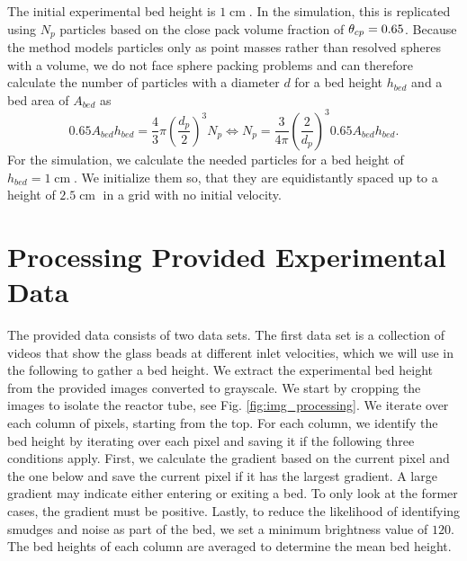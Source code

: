 The initial experimental bed height is $1 \operatorname{cm}$.
In the simulation, this is replicated using $N_p$ particles based on the close pack volume fraction of $\theta_{cp} = 0.65$.
Because the \MP method models particles only as point masses rather than resolved spheres with a volume, we do not face sphere packing problems and can therefore calculate the number of particles with a diameter $d$ for a bed height $h_{bed}$ and a bed area of $A_{bed}$ as
\begin{equation*}
    0.65  A_{bed} h_{bed} = \dfrac{4}{3} \pi \left( \dfrac{d_p}{2} \right)^3 N_p
    \Leftrightarrow 
    N_p = \dfrac{3}{4 \pi} \left( \dfrac{2}{d_p} \right)^3 0.65  A_{bed} h_{bed}.
\end{equation*}
For the simulation, we calculate the needed particles for a bed height of $h_{bed} = 1 \operatorname{cm}$. We initialize them so, that they are equidistantly spaced up to a height of $2.5 \operatorname{cm}$ in a grid with no initial velocity.



\section{Processing Provided Experimental Data}
\label{sec:bedHeightBest}
The provided data consists of two data sets. 
The first data set is a collection of videos that show the glass beads at different inlet velocities, which we will use in the following to gather a bed height.
We extract the experimental bed height from the provided images converted to grayscale.
We start by cropping the images to isolate the reactor tube, see Fig. \ref{fig:img_processing}.
We iterate over each column of pixels, starting from the top.
For each column, we identify the bed height by iterating over each pixel and saving it if the following three conditions apply.
First, we calculate the gradient based on the current pixel and the one below and save the current pixel if it has the largest gradient.
A large gradient may indicate either entering or exiting a bed. To only look at the former cases, the gradient must be positive.
Lastly, to reduce the likelihood of identifying smudges and noise as part of the bed, we set a minimum brightness value of $120$.
The bed heights of each column are averaged to determine the mean bed height.


